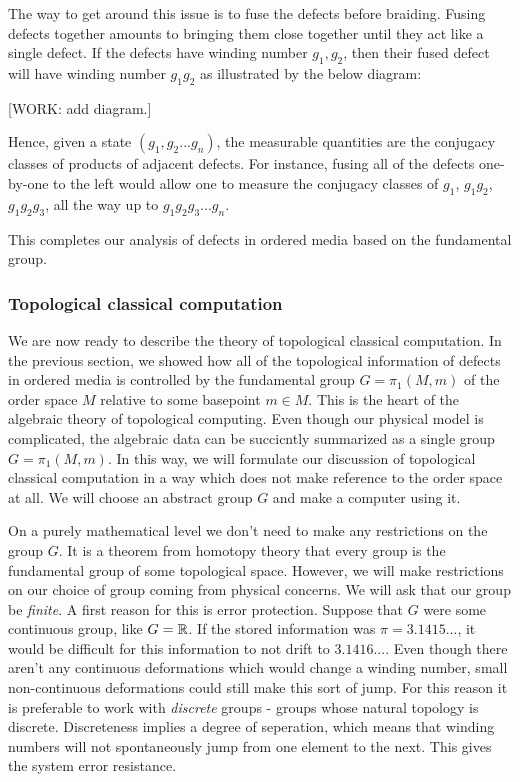 The way to get around this issue is to fuse the defects before braiding. Fusing defects together amounts to bringing them close together until they act like a single defect. If the defects have winding number $g_1,g_2$, then their fused defect will have winding number $g_1g_2$ as illustrated by the below diagram:

[WORK: add diagram.]

Hence, given a state $(g_1,g_2... g_n)$, the measurable quantities are the conjugacy classes of products of adjacent defects. For instance, fusing all of the defects one-by-one to the left would allow one to measure the conjugacy classes of $g_1$, $g_1g_2$, $g_1g_2g_3$, all the way up to $g_1g_2g_3...g_n$.

This completes our analysis of defects in ordered media based on the fundamental group.

\subsubsection{Topological classical computation}

We are now ready to describe the theory of topological classical computation. In the previous section, we showed how all of the topological information of defects in ordered media is controlled by the fundamental group $G=\pi_1(M,m)$ of the order space $M$ relative to some basepoint $m\in M$. This is the heart of the algebraic theory of topological computing. Even though our physical model is complicated, the algebraic data can be succicntly summarized as a single group $G=\pi_1(M,m)$. In this way, we will formulate our discussion of topological classical computation in a way which does not make reference to the order space at all. We will choose an abstract group $G$ and make a computer using it.

On a purely mathematical level we don't need to make any restrictions on the group $G$. It is a theorem from homotopy theory that every group is the fundamental group of some topological space. However, we will make restrictions on our choice of group coming from physical concerns. We will ask that our group be \textit{finite}. A first reason for this is error protection. Suppose that $G$ were some continuous group, like $G=\mathbb{R}$. If the stored information was $\pi=3.1415...$, it would be difficult for this information to not drift to $3.1416...$. Even though there aren't any continuous deformations which would change a winding number, small non-continuous deformations could still make this sort of jump. For this reason it is preferable to work with \textit{discrete} groups - groups whose natural topology is discrete. Discreteness implies a degree of seperation, which means that winding numbers will not spontaneously jump from one element to the next. This gives the system error resistance.

